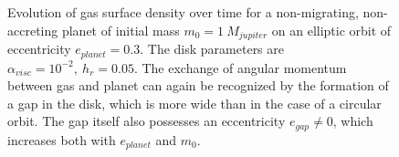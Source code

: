     \begin{figure}[h!]
      \centering
      \begin{minipage}{.3\linewidth}
        \centering
      \end{minipage}%
      \begin{minipage}{.3\linewidth}
        \centering
      \end{minipage}%
      \begin{minipage}{.3\linewidth}
        \centering
      \end{minipage}
      \caption{
        Evolution of gas surface density over time for a non-migrating,
        non-accreting planet of initial mass $m_0=1\ M_{jupiter}$ 
        on an elliptic orbit of eccentricity $e_{planet}=0.3$. 
        The disk parameters are 
        $\alpha_{visc}=10^{-2},\ h_r=0.05$. 
        The exchange of angular momentum between gas and planet can again be 
        recognized by the formation of a gap in the disk, which is more wide 
        than in the case of a circular orbit. The gap itself also possesses an 
        eccentricity $e_{gap}\neq0$, 
        which increases both with $e_{planet}$ and $m_0$.
      }
      \label{fig:first_runs_0.3}
    \end{figure}

%
  
  \newpage
